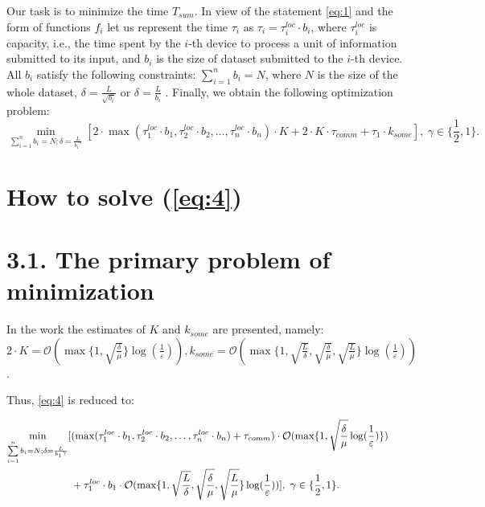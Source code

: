 \documentclass{article}
\theoremstyle{definition}
\theoremstyle{plain}
\begin{document}
Our task is to minimize the time $T_{sum}$. In view of the statement \eqref{eq:1} and the form of functions $f_i$ let us represent the time $\tau_i$ as $\tau_i = \tau_i^{loc}\cdot b_i$, where $\tau_i^{loc}$ is capacity, i.e., the time spent by the $i$-th device to process a unit of information submitted to its input, and $b_i$ is the size of dataset submitted to the $i$-th device. All $b_i$ satisfy the following constraints: $\sum\limits_{i = 1}^{n} b_i = N$, where $N$ is the size of the whole dataset, $\delta = \frac{L}{\sqrt{b_i}}$ or $\delta = \frac{L}{b_i}$ \cite{hendrikx2020statistically}.
Finally, we obtain the following optimization problem:
\begin{equation}
    \label{eq:4}
    \underset{\sum\limits_{i = 1}^{n} b_i = N; \delta = \frac{L}{{b_1}^{\gamma}}}{\min}[ 2\cdot\max(\tau_1^{loc}\cdot b_1, \tau_2^{loc}\cdot b_2, \ldots, \tau_n^{loc}\cdot b_n)\cdot K + 2\cdot K\cdot\tau_{comm} + \tau_1\cdot k_{some}], ~ \gamma \in \{\frac{1}{2}, 1\}.
\end{equation}

\section{How to solve (\ref{eq:4})}

\section*{3.1. The primary problem of minimization}
In the work \cite{kovalev2022optimal} the estimates of $K$ and $k_{some}$ are presented, namely: $2\cdot K = \mathcal O(\max\{1, \sqrt{\frac{\delta}{\mu}}\}\log(\frac{1}{\varepsilon})), k_{some} = \mathcal O(\max\{1, \sqrt{\frac{L}{\delta}}, \sqrt{\frac{\delta}{\mu}}, \sqrt{\frac{L}{\mu}}\}\log(\frac{1}{\varepsilon}))$.

Thus, \eqref{eq:4} is reduced to:

\begin{eqnarray}
    \begin{split}
    \label{eq:5}
        \underset{\sum\limits_{i = 1}^{n} b_i = N; \delta = \frac{L}{{b_1}^\gamma}}{\min}[&(\max(\tau_1^{loc}\cdot b_1, \tau_2^{loc}\cdot b_2, \ldots, \tau_n^{loc}\cdot b_n) + \tau_{comm}) \cdot \mathcal O(\max\{1, \sqrt{\frac{\delta}{\mu}}\log(\frac{1}{\varepsilon})\}) 
        \\&+
        \tau_1^{loc}\cdot b_1\cdot\mathcal O(\max\{1,\sqrt{\frac{L}{\delta}}, \sqrt{\frac{\delta}{\mu}}, \sqrt{\frac{L}{\mu}}\}\log(\frac{1}{\varepsilon}))] ,  ~ \gamma \in \{\frac{1}{2}, 1\}. \hspace{2.4cm}
    \end{split}
\end{eqnarray}
\end{document}
